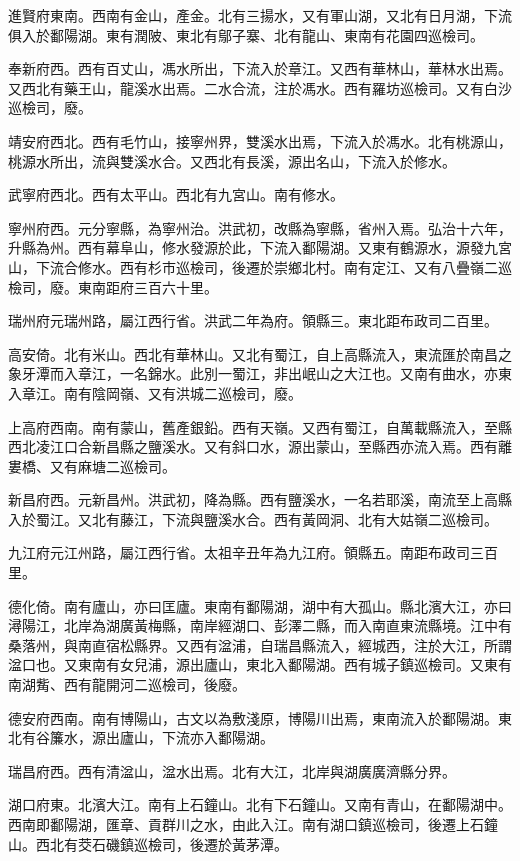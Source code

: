 進賢府東南。西南有金山，產金。北有三揚水，又有軍山湖，又北有日月湖，下流俱入於鄱陽湖。東有潤陂、東北有鄔子寨、北有龍山、東南有花園四巡檢司。

奉新府西。西有百丈山，馮水所出，下流入於章江。又西有華林山，華林水出焉。又西北有藥王山，龍溪水出焉。二水合流，注於馮水。西有羅坊巡檢司。又有白沙巡檢司，廢。

靖安府西北。西有毛竹山，接寧州界，雙溪水出焉，下流入於馮水。北有桃源山，桃源水所出，流與雙溪水合。又西北有長溪，源出名山，下流入於修水。

武寧府西北。西有太平山。西北有九宮山。南有修水。

寧州府西。元分寧縣，為寧州治。洪武初，改縣為寧縣，省州入焉。弘治十六年，升縣為州。西有幕阜山，修水發源於此，下流入鄱陽湖。又東有鶴源水，源發九宮山，下流合修水。西有杉市巡檢司，後遷於崇鄉北村。南有定江、又有八疊嶺二巡檢司，廢。東南距府三百六十里。

瑞州府元瑞州路，屬江西行省。洪武二年為府。領縣三。東北距布政司二百里。

高安倚。北有米山。西北有華林山。又北有蜀江，自上高縣流入，東流匯於南昌之象牙潭而入章江，一名錦水。此別一蜀江，非出岷山之大江也。又南有曲水，亦東入章江。南有陰岡嶺、又有洪城二巡檢司，廢。

上高府西南。南有蒙山，舊產銀鉛。西有天嶺。又西有蜀江，自萬載縣流入，至縣西北凌江口合新昌縣之鹽溪水。又有斜口水，源出蒙山，至縣西亦流入焉。西有離婁橋、又有麻塘二巡檢司。

新昌府西。元新昌州。洪武初，降為縣。西有鹽溪水，一名若耶溪，南流至上高縣入於蜀江。又北有藤江，下流與鹽溪水合。西有黃岡洞、北有大姑嶺二巡檢司。

九江府元江州路，屬江西行省。太祖辛丑年為九江府。領縣五。南距布政司三百里。

德化倚。南有廬山，亦曰匡廬。東南有鄱陽湖，湖中有大孤山。縣北濱大江，亦曰潯陽江，北岸為湖廣黃梅縣，南岸經湖口、彭澤二縣，而入南直東流縣境。江中有桑落州，與南直宿松縣界。又西有湓浦，自瑞昌縣流入，經城西，注於大江，所謂湓口也。又東南有女兒浦，源出廬山，東北入鄱陽湖。西有城子鎮巡檢司。又東有南湖觜、西有龍開河二巡檢司，後廢。

德安府西南。南有博陽山，古文以為敷淺原，博陽川出焉，東南流入於鄱陽湖。東北有谷簾水，源出廬山，下流亦入鄱陽湖。

瑞昌府西。西有清湓山，湓水出焉。北有大江，北岸與湖廣廣濟縣分界。

湖口府東。北濱大江。南有上石鐘山。北有下石鐘山。又南有青山，在鄱陽湖中。西南即鄱陽湖，匯章、貢群川之水，由此入江。南有湖口鎮巡檢司，後遷上石鐘山。西北有茭石磯鎮巡檢司，後遷於黃茅潭。

